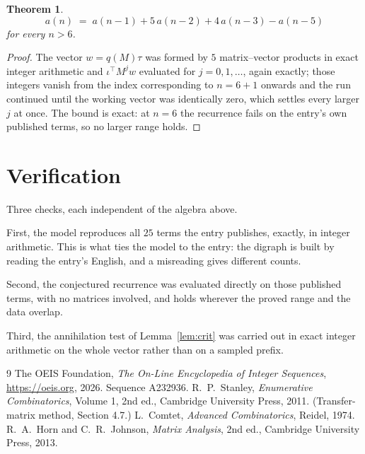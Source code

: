 \documentclass[11pt,a4paper]{article}
\theoremstyle{plain}
\newtheorem{theorem}{Theorem}
\theoremstyle{definition}
\begin{document}
\begin{theorem}
\[
a(n)\;=\;a(n-1) + 5\,a(n-2) + 4\,a(n-3) - a(n-5)
\]
for every $n>6$.
\end{theorem}

\begin{proof}
The vector $w=q(M)\tau$ was formed by $5$ matrix--vector products in exact integer
arithmetic and $\iota^{\!\top}M^{j}w$ evaluated for $j=0,1,\dots$, again exactly; those
integers vanish from the index corresponding to $n=6+1$ onwards and the run continued
until the working vector was identically zero, which settles every larger $j$ at once. The bound is exact: at $n=6$ the recurrence fails on the entry's own published terms, so no larger range holds.
\end{proof}

\section{Verification}

Three checks, each independent of the algebra above.

First, the model reproduces all $25$ terms the entry publishes, exactly, in integer
arithmetic. This is what ties the model to the entry: the digraph is built by reading the
entry's English, and a misreading gives different counts.

Second, the conjectured recurrence was evaluated directly on those published terms, with no
matrices involved, and holds wherever the proved range and the data overlap.

Third, the annihilation test of Lemma~\ref{lem:crit} was carried out in exact integer
arithmetic on the whole vector rather than on a sampled prefix.

\begin{thebibliography}{9}
 The OEIS Foundation, \emph{The On-Line Encyclopedia of Integer
Sequences}, \url{https://oeis.org}, 2026. Sequence A232936.
 R.~P.~Stanley, \emph{Enumerative Combinatorics}, Volume 1, 2nd ed.,
Cambridge University Press, 2011. (Transfer-matrix method, Section 4.7.)
 L.~Comtet, \emph{Advanced Combinatorics}, Reidel, 1974.
 R.~A.~Horn and C.~R.~Johnson, \emph{Matrix Analysis}, 2nd ed., Cambridge
University Press, 2013.
\end{thebibliography}
\end{document}
